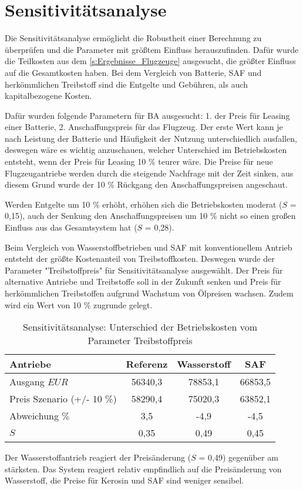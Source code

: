 \section{Sensitivitätsanalyse}
\label{s:Sensitivitätsanalyse}
%
Die Sensitivitätsanalyse ermöglicht die Robustheit einer Berechnung zu überprüfen und die Parameter mit größtem Einfluss herauszufinden. 
Dafür wurde die Teilkosten aus dem \ref{s:Ergebnisse_Flugzeuge} ausgesucht, die größter Einfluss auf die Gesamtkosten haben. 
Bei dem Vergleich von Batterie, SAF und herkömmlichen Treibstoff sind die Entgelte und Gebühren, als auch kapitalbezogene Kosten.

Dafür wurden folgende Parametern für BA ausgesucht: 1. der Preis für Leasing einer Batterie, 2. Anschaffungspreis für das Flugzeug.
Der erste Wert kann je nach Leistung der Batterie und Häufigkeit der Nutzung unterschiedlich ausfallen, deswegen wäre es wichtig anzuschauen,
welcher Unterschied im Betriebskosten entsteht, wenn der Preis für Leasing 10 \% teurer wäre. Die Preise für neue Flugzeugantriebe
werden durch die steigende Nachfrage mit der Zeit sinken, aus diesem Grund wurde der 10 \% Rückgang den Anschaffungspreisen angeschaut.

Werden Entgelte um 10 \% erhöht, erhöhen sich die Betriebskosten moderat ($S$ = 0,15), auch der Senkung den Anschaffungspreisen
um 10 \% nicht so einen großen Einfluss aus das Gesamtsystem hat ($S$ = 0,28).

Beim Vergleich von Wasserstoffbetrieben und SAF mit konventionellem Antrieb entsteht der größte Kostenanteil
von Treibstoffkosten. Deswegen wurde der Parameter "Treibstoffpreis" für Sensitivitätsanalyse ausgewählt.
Der Preis für alternative Antriebe und Treibstoffe soll in der Zukunft senken und Preis für herkömmlichen
Treibstoffen aufgrund Wachstum von Ölpreisen wachsen. Zudem wird ein Wert von 10 \% zugrunde gelegt.

\begin{table}[h]
	\begin{center}
    \caption{Sensitivitätsanalyse: Unterschied der Betriebskosten vom Parameter Treibstoffpreis}
	\label{BA_Infrastrukturtab}
	\begin{tabular}{|l|c|c|c|}
		\hline
		Antriebe & \textbf{Referenz}& \textbf{Wasserstoff}& \textbf{SAF} \\ \hline
		Ausgang $EUR$ & 56340,3 & 78853,1 & 66853,5  \\ \hline
        Preis Szenario (+/- 10 \%) & 58290,4  & 75020,3 & 63852,1 \\ \hline
        Abweichung $\%$ & 3,5 & -4,9 & -4,5 \\ \hline
		$S$ & 0,35 & 0,49 & 0,45 \\ \hline
	\end{tabular}
    \end{center}
\end{table}

Der Wasserstoffantrieb reagiert der Preisänderung ($S$ = 0,49) gegenüber am stärksten. Das System reagiert relativ 
empfindlich auf die Preisänderung von Wasserstoff, die Preise für Kerosin und SAF sind weniger sensibel.
